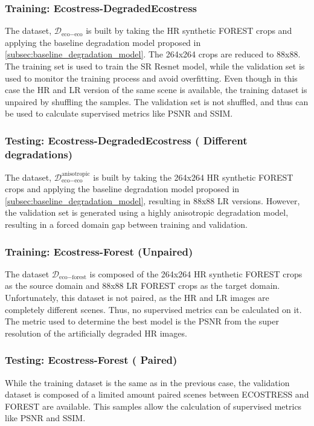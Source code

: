         \subsubsection{Training: Ecostress-DegradedEcostress}
            The dataset, $\mathcal{D}_{\text{eco}-\text{eco}}$ is built by taking the HR synthetic FOREST crops and applying the baseline degradation model proposed in \ref{subsec:baseline_degradation_model}. 
            The 264x264 crops are reduced to 88x88. The training set is used to train the SR Resnet model, while the validation set is used to monitor the training process and avoid overfitting. 
            Even though in this case the HR and LR version of the same scene is available, the training dataset is unpaired by shuffling the samples.
            The validation set is not shuffled, and thus can be used to calculate supervised metrics like PSNR and SSIM.

        \subsubsection{Testing: Ecostress-DegradedEcostress ( Different degradations)}
            The dataset, $\mathcal{D}_{\text{eco}-\text{eco}}^{\text{anisotropic}}$ is built by taking the 264x264 HR synthetic FOREST crops and applying the baseline degradation model proposed in \ref{subsec:baseline_degradation_model}, resulting in 88x88 LR versions. 
            However, the validation set is generated using a highly anisotropic degradation model, resulting in a forced domain gap between training and validation.
        
        \subsubsection{Training: Ecostress-Forest (Unpaired)}
            The dataset $\mathcal{D}_{\text{eco}-\text{forest}}$ is composed of the 264x264 HR synthetic FOREST crops as the source domain and  88x88 LR FOREST crops as the target domain. 
            Unfortunately, this dataset is not paired, as the HR and LR images are completely different scenes.
            Thus, no supervised metrics can be calculated on it. The metric used to determine the best model is the PSNR from the super resolution of the artificially degraded HR images.
        
        \subsubsection{Testing: Ecostress-Forest ( Paired)}
            While the training dataset is the same as in the previous case, the validation dataset is composed of a limited amount paired scenes between ECOSTRESS and FOREST are available.
             This samples allow the calculation of supervised metrics like PSNR and SSIM.


\clearpage
